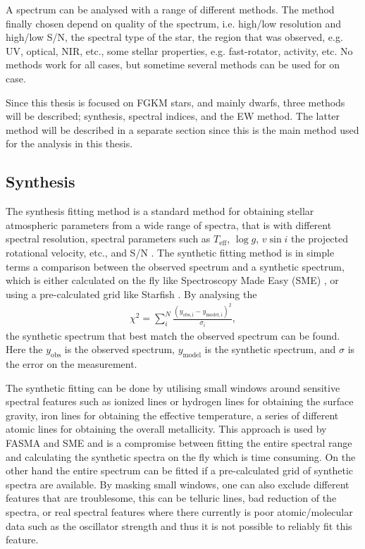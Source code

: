 A spectrum can be analysed with a range of different methods. The method finally chosen depend on
quality of the spectrum, i.e. high/low resolution and high/low S/N, the spectral type of the star,
the region that was observed, e.g. UV, optical, NIR, etc., some stellar properties, e.g.
fast-rotator, activity, etc. No methods work for all cases, but sometime several methods can be used
for on case.

Since this thesis is focused on FGKM stars, and mainly dwarfs, three methods will be described;
synthesis, spectral indices, and the EW method. The latter method will be described in a separate
section since this is the main method used for the analysis in this thesis.



\subsection{Synthesis}
\label{sec:synthesis}

The synthesis fitting method is a standard method for obtaining stellar atmospheric parameters from
a wide range of spectra, that is with different spectral resolution, spectral parameters such as
$T_\mathrm{eff}$, $\log g$, $v\sin i$ the projected rotational velocity, etc., and S/N  \citep[see
e.g.][]{Tsantaki2017}. The synthetic fitting method is in simple terms a comparison between the
observed spectrum and a synthetic spectrum, which is either calculated on the fly like Spectroscopy
Made Easy (SME) \citep{Valenti1996}, or using a pre-calculated grid like Starfish
\citep{Czekala2015}. By analysing the
\begin{align}
  \chi^2 = \sum_i^N\frac{(y_\mathrm{obs,i}-y_\mathrm{model,i})^2}{\sigma_i},
\end{align}
the synthetic spectrum that best match the observed spectrum can be found. Here the $y_\mathrm{obs}$
is the observed spectrum, $y_\mathrm{model}$ is the synthetic spectrum, and $\sigma$ is the error on
the measurement.

The synthetic fitting can be done by utilising small windows around sensitive spectral features such
as ionized lines or hydrogen lines for obtaining the surface gravity, iron lines for obtaining the
effective temperature, a series of different atomic lines for obtaining the overall metallicity.
This approach is used by FASMA and SME \citep[][respectively]{Valenti1996,Tsantaki2017} and is a
compromise between fitting the entire spectral range and calculating the synthetic spectra on the
fly which is time consuming. On the other hand the entire spectrum can be fitted if a pre-calculated
grid of synthetic spectra are available. By masking small windows, one can also exclude different
features that are troublesome, this can be telluric lines, bad reduction of the spectra, or real
spectral features where there currently is poor atomic/molecular data such as the oscillator
strength and thus it is not possible to reliably fit this feature.

